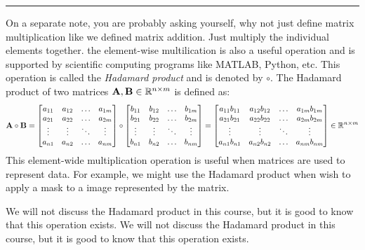 \begin{boxedstuff}
    \vspace{4mm}
    \hrule
    \vspace{2mm}

    On a separate note, you are probably asking yourself, why not just define matrix multiplication like we defined matrix addition. Just multiply the individual elements together. the element-wise multilication is also a useful operation and is supported by scientific computing programs like MATLAB, Python, etc. This operation is called the \textit{Hadamard product} and is denoted by $\circ$. The Hadamard product of two matrices $\mathbf{A}, \mathbf{B} \in \mathbb{R}^{n \times m}$ is defined as:
    \begin{equation}
        \mf{A} \circ \mf{B} = \bmxc a_{11} & a_{12} & \ldots & a_{1m} \\ a_{21} & a_{22} & \ldots & a_{2m} \\ \vdots & \vdots & \ddots & \vdots \\ a_{n1} & a_{n2} & \ldots & a_{nm} \emx \circ \bmxc b_{11} & b_{12} & \ldots & b_{1m} \\ b_{21} & b_{22} & \ldots & b_{2m} \\ \vdots & \vdots & \ddots & \vdots \\ b_{n1} & b_{n2} & \ldots & b_{nm} \emx = \bmxc a_{11}b_{11} & a_{12}b_{12} & \ldots & a_{1m}b_{1m} \\ a_{21}b_{21} & a_{22}b_{22} & \ldots & a_{2m}b_{2m} \\ \vdots & \vdots & \ddots & \vdots \\ a_{n1}b_{n1} & a_{n2}b_{n2} & \ldots & a_{nm}b_{nm} \emx \in \mb{R}^{n \times m}
        \label{eq:ch02-mat-hadamard}
    \end{equation}
    This element-wide multiplication operation is useful when matrices are used to represent data. For example, we might use the Hadamard product when wish to apply a mask to a image represented by the matrix. 
    
    We will not discuss the Hadamard product in this course, but it is good to know that this operation exists.
    We will not discuss the Hadamard product in this course, but it is good to know that this operation exists.
\end{boxedstuff}